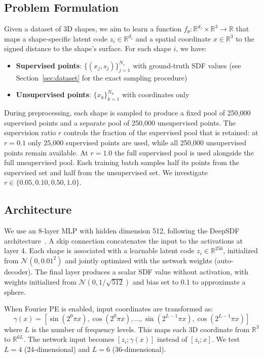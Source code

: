 \documentclass[conference]{IEEEtran}
\begin{document}
\subsection{Problem Formulation}

Given a dataset of 3D shapes, we aim to learn a function $f_\theta: \mathbb{R}^{d_z} \times \mathbb{R}^3 \to \mathbb{R}$ that maps a shape-specific latent code $z_i \in \mathbb{R}^{d_z}$ and a spatial coordinate $x \in \mathbb{R}^3$ to the signed distance to the shape's surface. For each shape $i$, we have:
\begin{itemize}
    \item \textbf{Supervised points}: $\{(x_j, s_j)\}_{j=1}^{N_s}$ with ground-truth SDF values (see Section~\ref{sec:dataset} for the exact sampling procedure)
    \item \textbf{Unsupervised points}: $\{x_k\}_{k=1}^{N_u}$ with coordinates only
\end{itemize}
During preprocessing, each shape is sampled to produce a fixed pool of 250{,}000 supervised points and a separate pool of 250{,}000 unsupervised points. The supervision ratio $r$ controls the fraction of the supervised pool that is retained: at $r = 0.1$ only 25{,}000 supervised points are used, while all 250{,}000 unsupervised points remain available. At $r = 1.0$ the full supervised pool is used alongside the full unsupervised pool. Each training batch samples half its points from the supervised set and half from the unsupervised set. We investigate $r \in \{0.05, 0.10, 0.50, 1.0\}$.

\subsection{Architecture}

We use an 8-layer MLP with hidden dimension 512, following the DeepSDF architecture~\cite{deepsdf}. A skip connection concatenates the input to the activations at layer 4. Each shape is associated with a learnable latent code $z_i \in \mathbb{R}^{256}$, initialized from $\mathcal{N}(0, 0.01^2)$ and jointly optimized with the network weights (auto-decoder). The final layer produces a scalar SDF value without activation, with weights initialized from $\mathcal{N}(0, 1/\sqrt{512})$ and bias set to 0.1 to approximate a sphere.

When Fourier PE is enabled, input coordinates are transformed as:
\begin{equation}
    \gamma(x) =
    [\sin(2^0 \pi x), \cos(2^0 \pi x), \ldots,
    \sin(2^{L-1} \pi x), \cos(2^{L-1} \pi x)]
\end{equation}
where $L$ is the number of frequency levels. This maps each 3D coordinate from $\mathbb{R}^3$ to $\mathbb{R}^{6L}$. The network input becomes $[z_i; \gamma(x)]$ instead of $[z_i; x]$. We test $L=4$ (24-dimensional) and $L=6$ (36-dimensional).
\end{document}
